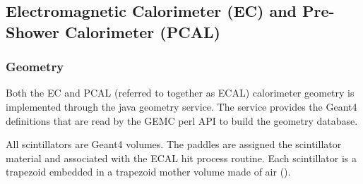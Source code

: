 \subsection{Electromagnetic Calorimeter (EC) and Pre-Shower Calorimeter (PCAL)}

\subsubsection{Geometry}

Both the EC and PCAL (referred to together as ECAL) calorimeter geometry is implemented through the java geometry service.
The service provides the Geant4 definitions that are read by the GEMC perl API to build the geometry database.

All scintillators are Geant4 volumes. The paddles are assigned the scintillator material and associated with the ECAL hit process routine.
Each scintillator is a trapezoid embedded in a trapezoid mother volume made of air ().

